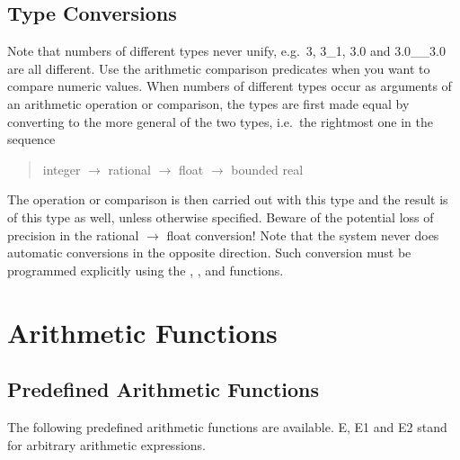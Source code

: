 \subsection{Type Conversions}
Note that numbers of different types never unify, e.g.\ 3, 3_1, 3.0
and 3.0__3.0 are all different.
Use the arithmetic comparison predicates when you want to
compare numeric values.
When numbers of different types occur as arguments of an arithmetic
operation or comparison, the types are first made equal by converting
to the more general of the two types, i.e.\ the rightmost one in the sequence
\begin{quote}
integer $\rightarrow$ rational $\rightarrow$ float $\rightarrow$ bounded real
\end{quote}
The operation or comparison is then carried out with this type and the
result is of this type as well, unless otherwise specified.
Beware of the potential loss of precision in the
rational $\rightarrow$ float conversion!
Note that the system never does automatic conversions in the opposite direction.
Such conversion must be programmed explicitly using the
,
,
 and
functions.

\section{Arithmetic Functions}
\subsection{Predefined Arithmetic Functions}
The following predefined arithmetic functions are available.
E, E1 and E2 stand for
arbitrary arithmetic expressions.

